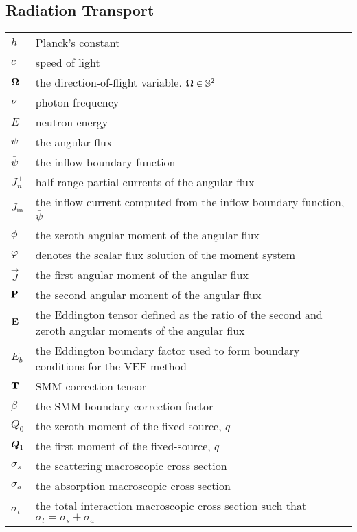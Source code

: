 \documentclass[../doc.tex]{subfiles}
\begin{document}
\subsection*{Radiation Transport}
\begin{longtable}{p{2cm}p{12cm}}
$h$ & Planck's constant \\
$c$ & speed of light \\
$\Omegahat$ & the direction-of-flight variable. $\Omegahat\in \mathbb{S}^2$\\
$\nu$ & photon frequency \\
$E$ & neutron energy \\
$\psi$ & the angular flux \\
$\bar{\psi}$ & the inflow boundary function \\
$J_n^\pm$ & half-range partial currents of the angular flux \\
$\Jin$ & the inflow current computed from the inflow boundary function, $\bar{\psi}$ \\
$\phi$ & the zeroth angular moment of the angular flux \\
$\varphi$ & denotes the scalar flux solution of the moment system \\
$\vec{J}$ & the first angular moment of the angular flux \\
$\P$ & the second angular moment of the angular flux \\
$\E$ & the Eddington tensor defined as the ratio of the second and zeroth angular moments of the angular flux \\
$E_b$ & the Eddington boundary factor used to form boundary conditions for the VEF method \\
$\T$ & SMM correction tensor \\
$\beta$ & the SMM boundary correction factor \\
$Q_0$ & the zeroth moment of the fixed-source, $q$ \\
$\Qone$ & the first moment of the fixed-source, $q$ \\
$\sigma_s$ & the scattering macroscopic cross section \\
$\sigma_a$ & the absorption macroscopic cross section \\
$\sigma_t$ & the total interaction macroscopic cross section such that $\sigma_t = \sigma_s + \sigma_a$ \\ 
\end{longtable}
\end{document}
